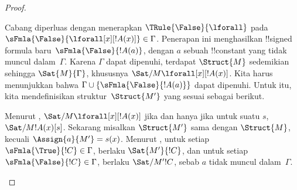 \documentclass[../../../include/open-logic-section]{subfiles}
\begin{document}
\begin{proof}
\begin{enumerate}
{\item Cabang diperluas dengan menerapkan $\TRule{\False}{\lforall}$ pada
  $\sFmla{\False}{\lforall[x][!A(x)]} \in \Gamma$. Penerapan ini
  menghasilkan !!{signed formula} baru~$\sFmla{\False}{!A(a)}$, dengan
  $a$ sebuah !!{constant} yang tidak muncul dalam~$\Gamma$. Karena
  $\Gamma$ dapat dipenuhi, terdapat $\Struct{M}$ sedemikian sehingga
  $\Sat{M}{\Gamma}$, khususnya
  $\Sat/{M}{\lforall[x][!A(x)]}$. Kita harus menunjukkan bahwa
  $\Gamma \cup \{\sFmla{\False}{!A(a)}\}$ dapat dipenuhi. Untuk itu,
  kita mendefinisikan struktur~$\Struct{M'}$ yang sesuai sebagai berikut.

  Menurut ,
  $\Sat/{M}{\lforall[x][!A(x)]}$ jika dan hanya jika untuk suatu $s$,
  $\Sat/{M}{!A(x)}[s]$. Sekarang misalkan $\Struct{M'}$ sama dengan
  $\Struct{M}$, kecuali $\Assign{a}{M'} = s(x)$. Menurut
  , untuk setiap
  $\sFmla{\True}{!C} \in \Gamma$, berlaku $\Sat{M'}{!C}$, dan untuk
  setiap $\sFmla{\False}{!C} \in \Gamma$, berlaku $\Sat/{M'}{!C}$,
  sebab $a$ tidak muncul dalam~$\Gamma$.

}
\end{enumerate}
\end{proof}
\end{document}
